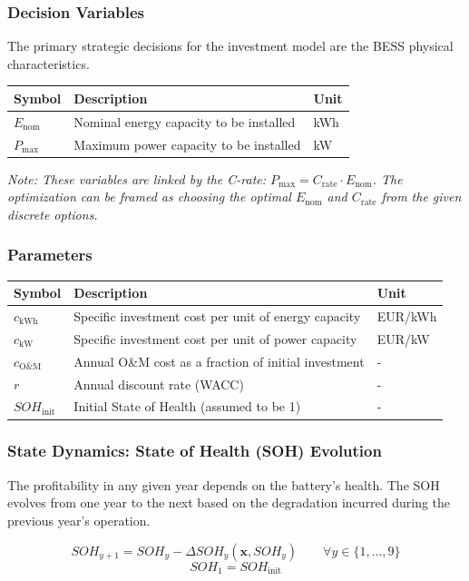 \documentclass[11pt, a4paper]{article}
\begin{document}
\subsubsection{Decision Variables}
The primary strategic decisions for the investment model are the BESS physical characteristics.
\begin{tabular}{@{}lll}
\toprule
Symbol & Description & Unit \\
\midrule
$E_{\text{nom}}$ & Nominal energy capacity to be installed & kWh \\
$P_{\text{max}}$ & Maximum power capacity to be installed & kW \\
\bottomrule
\end{tabular}
\textit{Note: These variables are linked by the C-rate: $P_{\text{max}} = C_{\text{rate}} \cdot E_{\text{nom}}$. The optimization can be framed as choosing the optimal $E_{\text{nom}}$ and $C_{\text{rate}}$ from the given discrete options.}

\subsubsection{Parameters}
\begin{tabular}{@{}lll}
\toprule
Symbol & Description & Unit \\
\midrule
$c_{\text{kWh}}$ & Specific investment cost per unit of energy capacity & EUR/kWh \\
$c_{\text{kW}}$ & Specific investment cost per unit of power capacity & EUR/kW \\
$c_{\text{O\&M}}$ & Annual O\&M cost as a fraction of initial investment & - \\
$r$ & Annual discount rate (WACC) & - \\
$SOH_{\text{init}}$ & Initial State of Health (assumed to be 1) & - \\
\bottomrule
\end{tabular}

\subsubsection{State Dynamics: State of Health (SOH) Evolution}
The profitability in any given year depends on the battery's health. The SOH evolves from one year to the next based on the degradation incurred during the previous year's operation.

\begin{equation}
SOH_{y+1} = SOH_y - \Delta SOH_y(\mathbf{x}, SOH_y) \qquad \forall y \in \{1, ..., 9\}
\end{equation}
\begin{equation}
SOH_1 = SOH_{\text{init}}
\end{equation}
\end{document}
